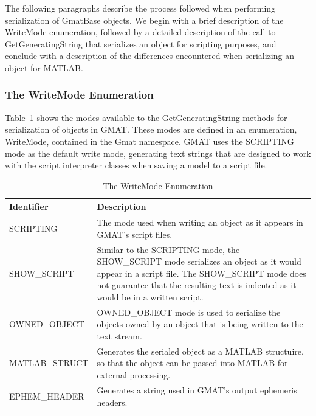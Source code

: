 The following paragraphs describe the process followed when performing serialization of GmatBase
objects.  We begin with a brief description of the WriteMode enumeration, followed by a detailed
description of the call to GetGeneratingString that serializes an object for scripting purposes,
and conclude with a description of the differences encountered when serializing an object for
MATLAB.

\subsubsection{\label{section:GenStringModes}The WriteMode Enumeration}

Table~\ref{table:WriteModeEnum} shows the modes available to the GetGeneratingString methods for
serialization of objects in GMAT.  These modes are defined in an enumeration, WriteMode, contained
in the Gmat namespace.  GMAT uses the SCRIPTING mode as the default write mode, generating text
strings that are designed to work with the script interpreter classes when saving a model to a
script file.

\begin{table}[htb]
\begin{center}
\caption{\label{table:WriteModeEnum}The WriteMode Enumeration}
\setlength\extrarowheight{2pt}
\begin{tabular}{|p{1.7in}|p{4in}|}
\hline
Identifier & Description \\
\hline
\hline
SCRIPTING & The mode used when writing an object as it appears in GMAT's script files.\\
SHOW\_SCRIPT & Similar to the SCRIPTING mode, the SHOW\_SCRIPT mode serializes an object as it
would appear in a script file.  The SHOW\_SCRIPT mode does not guarantee that the resulting text
is indented as it would be in a written script.\\
OWNED\_OBJECT & OWNED\_OBJECT mode is used to serialize the objects owned by an object that is
being written to the text stream.\\
MATLAB\_STRUCT & Generates the serialed object as a MATLAB structuire, so that the object can be
passed into MATLAB for external processing.\\
EPHEM\_HEADER & Generates a string used in GMAT's output ephemeris headers.\\
\hline
\end{tabular}
\end{center}
\end{table}

